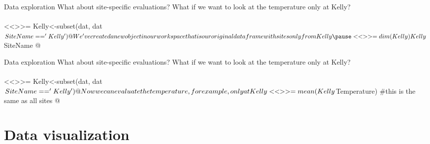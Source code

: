 \documentclass[xcolor=svgnames]{beamer}
\begin{document}
\begin{frame}[fragile,t]{Data exploration}
What about site-specific evaluations?  What if we want to look at the temperature only at Kelly?\\~\\
<<>>=
Kelly<-subset(dat, dat$SiteName=='Kelly')
@
\vspace{0.2in}
We've created a new object in our workspace that is our original data frame with sites only from Kelly\\~\\
\pause
<<>>=
dim(Kelly)
Kelly$SiteName
@

\end{frame}

\begin{frame}[fragile,t]{Data exploration}
What about site-specific evaluations?  What if we want to look at the temperature only at Kelly?\\~\\
<<>>=
Kelly<-subset(dat, dat$SiteName=='Kelly')
@
\vspace{0.2in}
Now we can evaluate the temperature, for example, only at Kelly\\~\\
<<>>=
mean(Kelly$Temperature) #this is the same as all sites
@
\end{frame}


\section{Data visualization}
\end{document}
